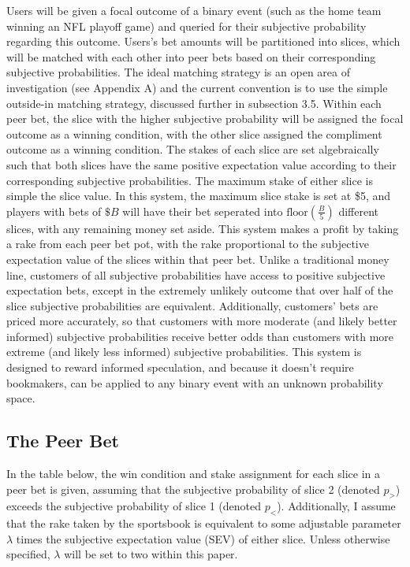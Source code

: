\documentclass[sn-mathphys-num]{sn-jnl}
\theoremstyle{thmstyleone}%
\theoremstyle{thmstyletwo}%
\theoremstyle{thmstylethree}%
\begin{document}
Users will be given a focal outcome of a binary event (such as the home team winning an NFL playoff game) and queried for their subjective probability regarding this outcome. Users's bet amounts will be partitioned into slices, which will be matched with each other into peer bets based on their corresponding subjective probabilities. The ideal matching strategy is an open area of investigation (see Appendix A) and the current convention is to use the simple outside-in matching strategy, discussed further in subsection 3.5. Within each peer bet, the slice with the higher subjective probability will be assigned the focal outcome as a winning condition, with the other slice assigned the compliment outcome as a winning condition. The stakes of each slice are set algebraically such that both slices have the same positive expectation value according to their corresponding subjective probabilities. The maximum stake of either slice is simple the slice value. In this system, the maximum slice stake is set at \$5, and players with bets of $\$B$ will have their bet seperated into $\textrm{floor}(\frac{B}{5})$ different slices, with any remaining money set aside. This system makes a profit by taking a rake from each peer bet pot, with the rake proportional to the subjective expectation value of the slices within that peer bet. Unlike a traditional money line, customers of all subjective probabilities have access to positive subjective expectation bets, except in the extremely unlikely outcome that over half of the slice subjective probabilities are equivalent. Additionally, customers' bets are priced more accurately, so that customers with more moderate (and likely better informed) subjective probabilities receive better odds than customers with more extreme (and likely less informed)  subjective probabilities. This system is designed to reward informed speculation, and because it doesn't require bookmakers, can be applied to any binary event with an unknown probability space.

\subsection{The Peer Bet}

In the table below, the win condition and stake assignment for each slice in a peer bet is given, assuming that the subjective probability of slice 2 (denoted $p_>$) exceeds the subjective probability of slice 1 (denoted $p_<$). Additionally, I assume that the rake taken by the sportsbook is equivalent to some adjustable parameter $\lambda$ times the subjective expectation value (SEV) of either slice. Unless otherwise specified, $\lambda$ will be set to two within this paper.
\end{document}

